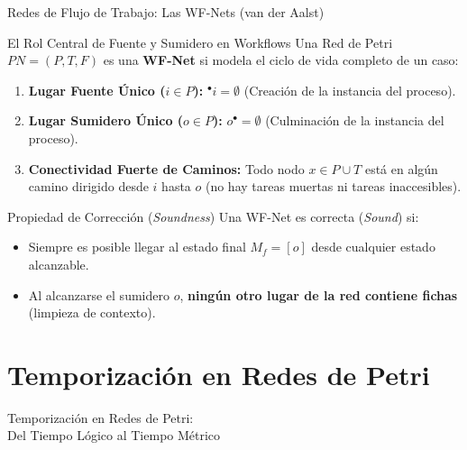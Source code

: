 \documentclass[10pt, aspectratio=169]{beamer}
\begin{document}
\begin{frame}{Redes de Flujo de Trabajo: Las WF-Nets (van der Aalst)}
	\begin{block}{El Rol Central de Fuente y Sumidero en Workflows}
		Una Red de Petri $PN = (P, T, F)$ es una \textbf{WF-Net} si modela el ciclo de vida completo de un caso:
		\begin{enumerate}
			\item \textbf{Lugar Fuente Único ($i \in P$):} ${}^\bullet i = \emptyset$ (Creación de la instancia del proceso).
			\item \textbf{Lugar Sumidero Único ($o \in P$):} $o^\bullet = \emptyset$ (Culminación de la instancia del proceso).
			\item \textbf{Conectividad Fuerte de Caminos:} Todo nodo $x \in P \cup T$ está en algún camino dirigido desde $i$ hasta $o$ (no hay tareas muertas ni tareas inaccesibles).
		\end{enumerate}
	\end{block}

	\begin{alertblock}{Propiedad de Corrección (\emph{Soundness})}
		Una WF-Net es correcta (\emph{Sound}) si:
		\begin{itemize}
			\item Siempre es posible llegar al estado final $M_f = [o]$ desde cualquier estado alcanzable.
			\item Al alcanzarse el sumidero $o$, \textbf{ningún otro lugar de la red contiene fichas} (limpieza de contexto).
		\end{itemize}
	\end{alertblock}
\end{frame}

\section{Temporización en Redes de Petri}

\begin{frame}{}
	\centering
	\Huge{Temporización en Redes de Petri: \\ Del Tiempo Lógico al Tiempo Métrico}
\end{frame}
\end{document}
